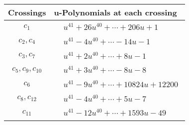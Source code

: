 \documentclass[1p]{elsarticle_modified}
\theoremstyle{definition}
\begin{document}
\begin{tabular}{m{50pt}|m{274pt}}
Crossings & \hspace{64pt}u-Polynomials at each crossing \\
\hline $$\begin{aligned}c_{1}\end{aligned}$$&$\begin{aligned}
&u^{41}+26 u^{40}+\cdots+206 u+1
\end{aligned}$\\
\hline $$\begin{aligned}c_{2},c_{4}\end{aligned}$$&$\begin{aligned}
&u^{41}-4 u^{40}+\cdots-14 u-1
\end{aligned}$\\
\hline $$\begin{aligned}c_{3},c_{7}\end{aligned}$$&$\begin{aligned}
&u^{41}+2 u^{40}+\cdots+8 u-1
\end{aligned}$\\
\hline $$\begin{aligned}c_{5},c_{9},c_{10}\end{aligned}$$&$\begin{aligned}
&u^{41}+3 u^{40}+\cdots-8 u-8
\end{aligned}$\\
\hline $$\begin{aligned}c_{6}\end{aligned}$$&$\begin{aligned}
&u^{41}-9 u^{40}+\cdots+10824 u+12200
\end{aligned}$\\
\hline $$\begin{aligned}c_{8},c_{12}\end{aligned}$$&$\begin{aligned}
&u^{41}-4 u^{40}+\cdots+5 u-7
\end{aligned}$\\
\hline $$\begin{aligned}c_{11}\end{aligned}$$&$\begin{aligned}
&u^{41}-12 u^{40}+\cdots+1593 u-49
\end{aligned}$\\
\hline
\end{tabular}\\~\\
\newpage\renewcommand{\arraystretch}{1}
\end{document}
